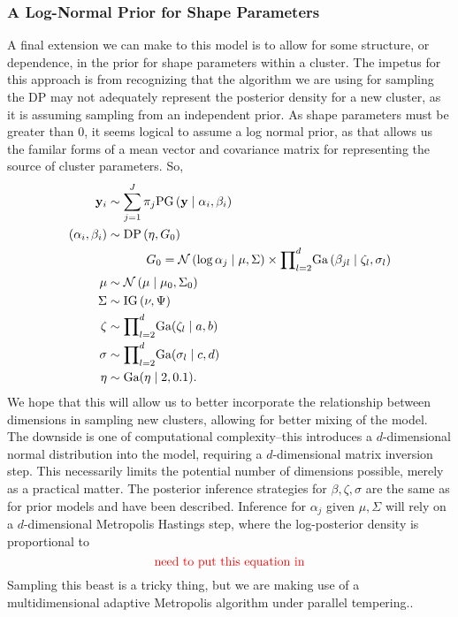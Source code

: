 \subsubsection{A Log-Normal Prior for Shape Parameters}
A final extension we can make to this model is to allow for some structure, or dependence, in the prior
  for shape parameters within a cluster.  The impetus for this approach is from recognizing that the
  algorithm we are using for sampling the DP may not adequately represent the posterior density for
  a new cluster, as it is assuming sampling from an independent prior.  As shape parameters must
  be greater than 0, it seems logical to assume a log normal prior, as that allows us the familar
  forms of a mean vector and covariance matrix for representing the source of cluster parameters. So,
  \begin{equation}
    \label{eqn:dpln}
    \begin{aligned}
      {\bf y}_i &\sim \sum_{j = 1}^J\pi_j\text{PG}\left({\bf y}\mid {\bf \alpha}_i, {\bf \beta}_i\right)\\
      (\alpha_i,\beta_i) &\sim \text{DP}\left(\eta, G_0\right)\\
        &~\hspace{1cm}G_0 = \mathcal{N}\left(\log{\bf \alpha}_{j}\mid\mu,\Sigma\right)\times
            {\small\prod}_{l = 2}^d\text{Ga}\left(\beta_{jl}\mid\zeta_l,\sigma_l\right)\\
      \mu &\sim \mathcal{N}\left(\mu\mid\mu_0,\Sigma_0\right)\\
      \Sigma &\sim \text{IG}\left(\nu,\Psi\right)\\
      {\bf \zeta} &\sim {\small\prod}_{l = 2}^d\text{Ga}(\zeta_l \mid a,b)\\
      {\bf \sigma} &\sim {\small\prod}_{l = 2}^d\text{Ga}(\sigma_l \mid c,d)\\
      {\bf \eta} &\sim \text{Ga}(\eta \mid 2, 0.1).
    \end{aligned}
  \end{equation}
  We hope that this will allow us to better incorporate the relationship between dimensions in
  sampling new clusters, allowing for better mixing of the model.  The downside is one of computational
  complexity--this introduces a $d$-dimensional normal distribution into the model, requiring a
  $d$-dimensional matrix inversion step.  This necessarily limits the potential number of dimensions
  possible, merely as a practical matter.  The posterior inference strategies for $\beta,\zeta,\sigma$
  are the same as for prior models and have been described.  Inference for $\alpha_j$ given $\mu,\Sigma$
  will rely on a $d$-dimensional Metropolis Hastings step, where the log-posterior density is proportional to
  \begin{equation}
    \label{eqn:dplnlp}
    \text{{\color{red} need to put this equation in}}
  \end{equation}
  Sampling this beast is a tricky thing, but we are making use of a multidimensional adaptive Metropolis
  algorithm  under parallel
  tempering..

